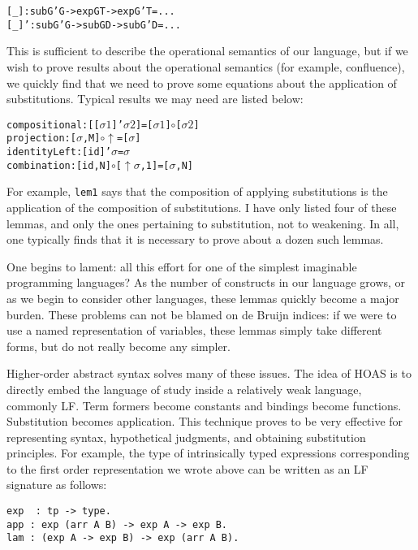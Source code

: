 \documentclass{article}
\begin{document}
\begin{alltt}
[_] : sub G' G -> exp G T -> exp G' T = ...
[_]' : sub G' G -> sub G D -> sub G' D = ...
\end{alltt}

This is sufficient to describe the operational semantics
of our language, but if we wish to prove results about the operational
semantics (for example, confluence), we quickly find that we need to
prove some equations about the application of substitutions. Typical
results we may need are listed below:

\begin{alltt}
compositional : [ [ \(\sigma1\) ]' \(\sigma2\) ] = [ \(\sigma1\) ] \(\circ\) [ \(\sigma2\) ]
projection    : [ \(\sigma\) , M ] \(\circ\) \(\uparrow\) = [ \(\sigma\) ]
identityLeft  : [ id ]' \(\sigma\) = \(\sigma\)
combination   : [ id , N ] \(\circ\) [ \(\uparrow\) \(\sigma\), 1 ] = [ \(\sigma\) , N ]
\end{alltt}

For example, \lstinline{lem1} says that the composition of applying
substitutions is the application of the composition of
substitutions. I have only listed four of these lemmas, and only the
ones pertaining to substitution, not to weakening. In all, one
typically finds that it is necessary to prove about a dozen such lemmas. 

One begins to lament: all this effort for one of the simplest imaginable programming
languages? As the number of constructs in our language grows, or as we
begin to consider other languages, these lemmas quickly become a major
burden. These problems can not be blamed on de Bruijn indices: if we were to use a named representation of variables, these
lemmas simply take different forms, but do not really become any
simpler.

Higher-order abstract syntax solves many of these issues. The 
idea of HOAS is to directly embed the language of study inside a
relatively weak language, commonly LF. Term formers become constants
and bindings become functions. Substitution becomes application. This
technique proves to be very effective for representing syntax,
hypothetical judgments, and obtaining substitution principles. For
example, the type of intrinsically typed expressions corresponding to
the first order representation we wrote above can be written as an LF
signature as follows: 

\begin{lstlisting}
exp  : tp -> type.
app : exp (arr A B) -> exp A -> exp B.
lam : (exp A -> exp B) -> exp (arr A B).
\end{lstlisting}
\end{document}
